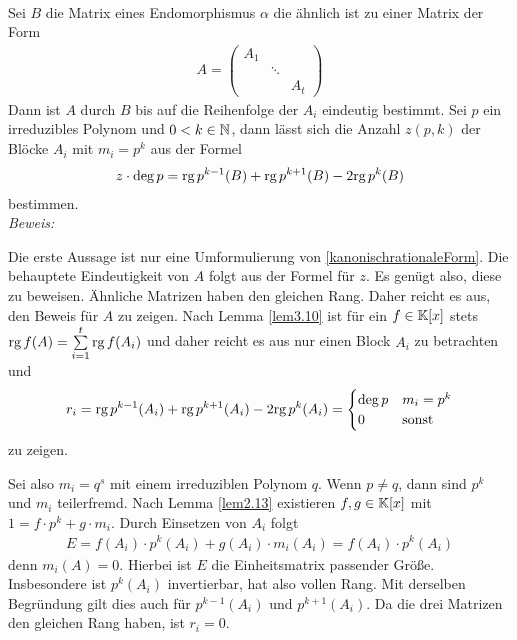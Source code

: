 \begin{mysatz}\label{anzahlbloeckeKRF}\

    Sei $B$ die Matrix eines Endomorphismus $\alpha$ die ähnlich ist zu einer Matrix der Form
    \begin{align*}
        A = 
        \begin{pmatrix}
        A_1 & & \\
         & \ddots & \\
         & & A_t
        \end{pmatrix}
    \end{align*}
    Dann ist $A$ durch $B$ bis auf die Reihenfolge der $A_i$ eindeutig bestimmt.
    Sei $p$ ein irreduzibles Polynom und $0 < k \in \mathbb{N}$, dann lässt sich die Anzahl  $z(p,k)$ der Blöcke $A_i$ mit $m_i = p^k$ aus der Formel
    \begin{align*}
        z \cdot \deg p = \text{rg}\, p^{k-1}(B) + \text{rg}\, p^{k+1}(B) - 2 \text{rg}\, p^k(B)
    \end{align*}
    bestimmen.\\

\textit{Beweis:}

    Die erste Aussage ist nur eine Umformulierung von \ref{kanonischrationaleForm}.
    Die behauptete Eindeutigkeit von $A$ folgt aus der Formel für $z$.
    Es genügt also, diese zu beweisen. Ähnliche Matrizen haben den gleichen Rang. Daher reicht es aus, den Beweis für $A$ zu zeigen.
    Nach Lemma \ref{lem3.10} ist für ein $f \in \mathbb{K}[x]$ stets $\text{rg}\, f(A) = \sum\limits_{i = 1}^t \text{rg}\, f(A_i)$ und daher reicht es aus nur einen Block $A_i$ zu betrachten und
    \begin{align*}
        r_i = \text{rg}\, p^{k-1}(A_i) + \text{rg}\, p^{k+1}(A_i) - 2\text{rg}\, p^k(A_i) = 
        \begin{cases}
            \deg p & m_i = p^k\\
            0 & \mbox{sonst}
        \end{cases}
        \end{align*}
        zu zeigen.

        Sei also $m_i = q^s$ mit einem irreduziblen Polynom $q$.
        Wenn $p \neq q$, dann sind $p^k$ und $m_i$ teilerfremd.
        Nach Lemma \ref{lem2.13} existieren $f,g \in \mathbb{K}[x]$ mit $1 = f \cdot p^k + g \cdot m_i$.
        Durch Einsetzen von $A_i$ folgt
        \begin{align*}
            E = f(A_i) \cdot p^k(A_i) + g(A_i) \cdot m_i(A_i) = f(A_i) \cdot p^k(A_i)
        \end{align*}
        denn $m_i(A) = 0$. Hierbei ist $E$ die Einheitsmatrix passender Größe.
        Insbesondere ist $p^k(A_i)$ invertierbar, hat also vollen Rang.
        Mit derselben Begründung gilt dies auch für $p^{k-1}(A_i)$ und $p^{k+1}(A_i)$. Da die drei Matrizen den gleichen Rang haben, ist $r_i=0$.


\end{mysatz}
